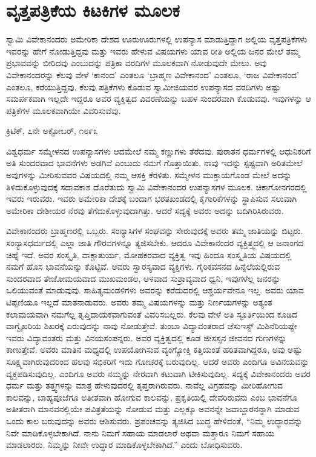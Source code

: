 
\chapter{ವೃತ್ತಪತ್ರಿಕೆಯ ಕಿಟಕಿಗಳ ಮೂಲಕ}

ಸ್ವಾಮಿ ವಿವೇಕಾನಂದರು ಅಮೇರಿಕಾ ದೇಶದ ಊರುಊರುಗಳಲ್ಲಿ ಉಪನ್ಯಾಸ ಮಾಡುತ್ತಿದ್ದಾಗ ಅಲ್ಲಿಯ ವೃತ್ತಪತ್ರಿಕೆಗಳು ಇವರನ್ನು ಹೇಗೆ ನೋಡುತ್ತಿದ್ದವು ಮತ್ತು ಇವರು ಹೇಳುವ ವಿಷಯಗಳು ಯಾವ ರೀತಿ ಅಲ್ಲಿಯ ಜನರ ಮೇಲೆ ತಮ್ಮ ಪ್ರಭಾವವನ್ನು ಬೀರಿದವು ಎಂಬುದನ್ನು ಪತ್ರಿಕಾ ವರದಿಗಳ ಮೂಲಕವಾಗಿ ನೋಡುವುದೇ ಮೇಲು. ಅವು ವಿವೇಕಾನಂದರನ್ನು ಕೆಲವು ವೇಳೆ ‘ಕಾನಂದ’ ಎಂತಲೂ ‘ಬ್ರಾಹ್ಮಣ ವಿವೇಕಾನಂದ’ ಎಂತಲೂ, ‘ರಾಜ ವಿವೇಕಾನಂದ’ ಎಂತಲೂ, ಕರೆಯುತ್ತಿದ್ದವು. ಕೆಲವು ಪತ್ರಿಕೆಗಳು ಕೊಡುವ ಸ್ವಾಮೀಜಿಯವರ ಉಪನ್ಯಾಸದ ವರದಿಗಳು ಅಷ್ಟು ಸಮರ್ಪಕವಾಗಿ ಇಲ್ಲದೇ ಇದ್ದರೂ ಅವರ ವ್ಯಕ್ತಿತ್ವದ ವಿವರಣೆಯನ್ನು ಬಹಳ ಸುಂದರವಾಗಿ ಕೊಡುವವು. ಇವುಗಳನ್ನು ಆ ಪತ್ರಿಕೆಗಳ ಮೂಲಕವಾಗಿಯೇ ವಿವರಿಸುವೆವು.

\begin{flushright}
ಕ್ರಿಟಿಕ್, ೭ನೇ ಅಕ್ಟೋಬರ್, ೧೮೯೩
\end{flushright}

 ವಿಶ್ವಧರ್ಮ ಸಮ್ಮೇಳನದ ಉಪನ್ಯಾಸಗಳು ಆದಮೇಲೆ ನಮ್ಮ ಕಣ್ಣುಗಳು ತೆರೆದವು. ಪುರಾತನ ಧರ್ಮಗಳಲ್ಲಿ ಆಧುನಿಕರಿಗೆ ಅತಿ ಸುಂದರವಾದ ಭಾವನೆಗಳು ಅಡಗಿವೆ ಎಂಬುದು ನಮಗೆ ಗೊತ್ತಾಯಿತು. ನಾವು ಇದನ್ನು ಸ್ಪಷ್ಟವಾಗಿ ಅರಿತಮೇಲೆ ಅವುಗಳನ್ನು ಮೀರಿಸುವವರ ವಿಷಯದಲ್ಲಿ ನಮ್ಮ ಆಸಕ್ತಿ ಕೆರಳಿತು. ಸಮ್ಮೇಳನ ಮುಕ್ತಾಯಗೊಂಡ ಮೇಲೆ ಅದನ್ನು ತಿಳಿದುಕೊಳ್ಳುವುದಕ್ಕೆ ಸದಾವಕಾಶ ದೊರೆತುದು ಸ್ವಾಮಿ ವಿವೇಕಾನಂದರ ಉಪನ್ಯಾಸಗಳ ಮೂಲಕ. ಚಿಕಾಗೋನಗರದಲ್ಲಿ ಇವರು ಇರುವರು. ಇವರು ಅಮೇರಿಕಾ ದೇಶಕ್ಕೆ ಬಂದಾಗ ಭರತಖಂಡದಲ್ಲಿ ಕೈಗಾರಿಕೆಗಳನ್ನು ಸ್ಥಾಪಿಸುವ ಸಲುವಾಗಿ ಅಮೇರಿಕಾ ದೇಶೀಯರ ನೆರವು ತೆಗೆದುಕೊಳ್ಳುವುದಾಗಿತ್ತು. ಆದರೆ ಸದ್ಯಕ್ಕೆ ಅವರು ಅದನ್ನು ಬದಿಗಿರಿಸಿರುವರು. 

 ವಿವೇಕಾನಂದರು ಬ್ರಾಹ್ಮಣರಲ್ಲಿ ಒಬ್ಬರು. ಸಂನ್ಯಾಸಿಗಳ ಸಂಘವನ್ನು ಸೇರುವುದಕ್ಕೆ ಅವರು ತಮ್ಮ ಜಾತಿಯನ್ನು ಬಿಟ್ಟರು. ಸಂನ್ಯಾಸಧರ್ಮದಲ್ಲಿ ಎಲ್ಲಾ ಜಾತಿ ಗೌರವಗಳನ್ನೂ ತ್ಯಜಿಸಬೇಕು. ಆದರೂ ವಿವೇಕಾನಂದರ ವ್ಯಕ್ತಿತ್ತ್ವದಲ್ಲಿ ಆ ಜನಾಂಗದ ಚಿಹ್ನೆ ಇದೆ. ಅವರ ಸಂಸ್ಕೃತಿ, ವಾಕ್ಚಾತುರ್ಯ, ಮೋಹಕರವಾದ ವ್ಯಕ್ತಿತ್ವ ಇವು ಹಿಂದೂ ಸಂಸ್ಕೃತಿಯ ವಿಷಯದಲ್ಲಿ ನಮಗೆ ಹೊಸ ಭಾವನೆಯನ್ನು ಕೊಟ್ಟಿವೆ. ಅವರು ಸ್ವಾರಸ್ಯವಾದ ವ್ಯಕ್ತಿಗಳು. ಗೈರಿಕವಸನದ ಹಿನ್ನೆಲೆಯಲ್ಲಿರುವ ಸುಂದರವಾದ ತೇಜೋಮಯವಾದ ಮುಖಮಂಡಲ, ಆಳವಾದ ಸುಶ್ರಾವ್ಯವಾದ ಧ್ವನಿ, ಇವುಗಳೆಲ್ಲ ಜನರನ್ನು ಒಲಿಯುವಂತೆ ಮಾಡುವುವು. ಸಾಹಿತ್ಯಮಂಡಳಿಗಳು ಅವರನ್ನು ಕರೆದುದರಲ್ಲಿ ಆಶ್ಚರ್ಯವೇನೂ ಇಲ್ಲ. ಅವರು ಯಾವ ಟಿಪ್ಪಣಿಯೂ ಇಲ್ಲದೆ ಮಾತನಾಡುವರು. ಅವರು ತಮ್ಮ ವಿಷಯಗಳನ್ನು ಮತ್ತು ನಿರ್ಣಯಗಳನ್ನು ಅತ್ಯಂತ ಕಲಾಮಯವಾಗಿ ನಮಗೆಲ್ಲ ತೃಪ್ತಿದಾಯಕವಾಗುವಂತೆ ವಿವರಿಸಬಲ್ಲರು. ಕೆಲವು ವೇಳೆ ಅತಿ ಸ್ಫೂರ್ತಿಯಿಂದ ಕೂಡಿದ ವಾಗ್ವೈಖರಿಯ ಶಿಖರಕ್ಕೆ ಏರುವುದನ್ನು ನಾವು ನೋಡುತ್ತೇವೆ. ತುಂಬಾ ವಿದ್ಯಾವಂತರಾದ ಜೆಸುಇಸ್ಟ್ ಮಿಶಿನೆರಿಯಷ್ಟೇ ಇವರು ವಿದ್ಯಾವಂತರು ಮತ್ತು ವಿನಯಸಂಪನ್ನರು. ಅವರ ವ್ಯಕ್ತಿತ್ವದಲ್ಲಿ ಕೂಡ ಜೀಸಸ್ಸನ ಜೀವನದ ಗುಣಗಳನ್ನು ಕಾಣುತ್ತೇವೆ. ಅವರು ಮಾತಿನ ಮಧ್ಯದಲ್ಲಿ ಉಪಯೋಗಿಸುವ ವ್ಯಂಗ್ಯೋಕ್ತಿ ಕತ್ತಿಯಂತೆ ಹರಿತವಾಗಿದ್ದರೂ, ಅವು ಅಷ್ಟು ಸೂಕ್ಷ್ಮವಾಗಿರುವುದರಿಂದ ಹಲವು ಸಭಿಕರಿಗೆ ಇದು ಗೋಚರಕ್ಕೆ ಬರುವುದಿಲ್ಲ. ಆದರೆ ಅವರು ಎಂದಿಗೂ ಅವಿನಯವನ್ನು ವ್ಯಕ್ತಪಡಿಸುವುದಿಲ್ಲ. ಎಂದಿಗೂ ಅವರು ನಮ್ಮನ್ನು ನೇರವಾಗಿ ಕಟುವಾಗಿ ಟೀಕಿಸುವುದಿಲ್ಲ. ಸದ್ಯಕ್ಕೆ ವಿವೇಕಾನಂದರು ಅವರ ಧರ್ಮ ಮತ್ತು ತತ್ತ್ವಗಳನ್ನು ಮಾತ್ರ ಹೇಳುವುದರಲ್ಲಿ ತೃಪ್ತರಾಗಿರುವರು. ನಾವೆಲ್ಲ ವಿಗ್ರಹವನ್ನು ಮೀರಿಹೋಗುವ ಕಾಲವನ್ನು, ಬಾಹ್ಯಪೂಜೆಗೂ ಅತೀತವಾಗಿ ಹೋಗುವ ಕಾಲವನ್ನು, ಪ್ರಕೃತಿಯಲ್ಲಿ ದೇವರಿರುವನು ಎಂಬ ಭಾವನೆಗೂ ಅತೀತರಾಗಿ ಮಾನವನಲ್ಲಿಯೇ ಪವಿತ್ರತೆಯನ್ನು ನೋಡುವ ಮತ್ತು ಎಲ್ಲಕ್ಕೂ ಅವನನ್ನೇ ಜವಾಬ್ದಾರನನ್ನಾಗಿ ಮಾಡುವ ಒಂದು ಕಾಲ ಬರುವುದನ್ನು ಅವರು ಆಶಿಸುವರು. ಪ್ರಪಂಚವನ್ನು ತ್ಯಜಿಸಿದ ಬುದ್ಧ ಹೇಳಿದಂತೆ, “ನಿಮ್ಮ ಉದ್ಧಾರವನ್ನು ನಿವೇ ಮಾಡಿಕೊಳ್ಳಬೇಕಾಗಿದೆ. ನಾನು ನಿಮಗೆ ಸಹಾಯ ಮಾಡಲಾರೆ ಅಥವಾ ಮತ್ತಾರೂ ನಿಮಗೆ ಸಹಾಯ ಮಾಡಲಾರರು. ನಿಮ್ಮನ್ನು ನೀವೇ ಉದ್ಧಾರ ಮಾಡಿಕೊಳ್ಳಬೇಕಾಗಿದೆ.” ಎಂದು ಬೋಧಿಸುವರು.

